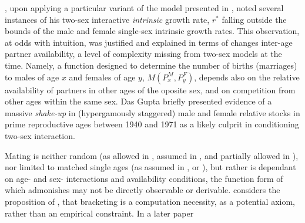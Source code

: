 
\citet{gupta1973}, upon applying a particular variant of the model presented in
\citep{gupta1972two}, noted several instances of his two-sex 
interactive \textit{intrinsic} growth
rate, $r^\ast$ falling outside the bounds of the male and female
single-sex intrinsic growth rates. This observation, at odds with intuition, was 
justified and explained in terms of changes inter-age partner availability, a
level of complexity missing from two-sex models at the time. Namely, a function designed
to determine the number of births (marriages) to males of age $x$ and females of
age $y$, $M(P_x^M, P_y^F)$, depends also on the relative availability of
partners in other ages of the oposite sex, and on competition from other ages
within the same sex. Das Gupta briefly presented evidence of a massive
\textit{shake-up} in (hypergamously staggered) male and female relative stocks in prime
reproductive ages between 1940 and 1971 as a likely culprit in conditioning
two-sex interaction. 

Mating is neither random (as allowed in
\cite{gupta1972two}, assumed in \cite{gupta1973}, and partially allowed in \cite{mitra1976effect}), nor limited to matched single ages (as assumed in \cite{karmel1947relations}, \cite{akers1967measuring} or \cite{cabre1997tortulos}), but rather is dependant on age- and sex- interactions and availability conditions, the function form of which
\citet{coale1972growth} admonishes may not be directly observable or derivable.
\citet{gupta1973} considers the proposition of \citet{coale1972growth}, that bracketing is a computation necessity, as a potential axiom, rather than an empirical constraint. In a later paper
\citep{gupta1976interactive}


